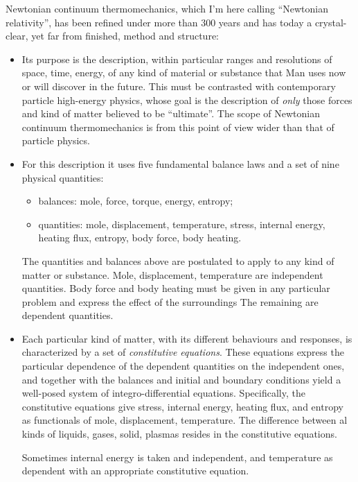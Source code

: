 \documentclass[\ifafour a4paper,12pt,\else a5paper,10pt,\fi%
onecolumn,oneside,article,%
british%
]{memoir}
\theoremstyle{remark}
\theoremstyle{innote}
\renewcommand*{\|}{\nonscript\,\vert\nonscript\;\mathopen{}}
\begin{document}
Newtonian continuum thermomechanics, which I'm here calling
\enquote{Newtonian relativity}, has been refined under more than 300 years
and has today a crystal-clear, yet far from finished, method and structure:
\begin{itemize}[para]
\item Its purpose is the description, within particular ranges and
  resolutions of space, time, energy, of any kind of material or substance
  that Man uses now or will discover in the future. This must be contrasted
  with contemporary particle high-energy physics, whose goal is the
  description of \emph{only} those forces and kind of matter believed to be
  \enquote{ultimate}. The scope of Newtonian continuum thermomechanics is
  from this point of view wider than that of particle physics.
\item For this description it uses five fundamental balance laws and a set
  of nine physical quantities:
  \begin{itemize}
  \item balances: mole, force, torque, energy, entropy;
  \item quantities: mole, displacement, temperature, stress,
    internal energy, heating flux, entropy, body force, body heating.
  \end{itemize}
  The quantities and balances above are postulated to apply to any kind of
  matter or substance. Mole, displacement, temperature are independent
  quantities. Body force and body heating must be given in any particular
  problem and express the effect of the surroundings The remaining are
  dependent quantities.
\item Each particular kind of matter, with its different behaviours and
  responses, is characterized by a set of \emph{constitutive equations}.
  These equations express the particular dependence of the dependent
  quantities on the independent ones, and together with the balances and
  initial and boundary conditions yield a well-posed system of
  integro-differential equations. Specifically, the constitutive equations
  give stress, internal energy, heating flux, and entropy as functionals of
  mole, displacement, temperature. The difference between al kinds of
  liquids, gases, solid, plasmas resides in the constitutive equations.
  
  Sometimes internal energy is taken and independent, and temperature as
  dependent with an appropriate constitutive equation.
\end{itemize}
\end{document}
